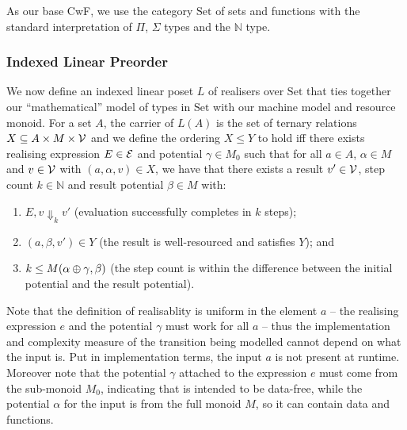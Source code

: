 \documentclass[acmsmall,review]{acmart}
\newcommand{\Set}{\mathrm{Set}}
\begin{document}
As our base CwF, we use the category $\Set$ of sets and functions with
the standard interpretation of $\Pi$, $\Sigma$ types and the
$\mathbb{N}$ type.

\subsubsection{Indexed Linear Preorder}
\label{sec:realisability-indexed-linear-preorder}

We now define an indexed linear poset $L$ of realisers over $\Set$
that ties together our ``mathematical'' model of types in $\Set$ with
our machine model and resource monoid. For a set $A$, the carrier of
$L(A)$ is the set of ternary relations
$X \subseteq A \times M \times \mathcal{V}$ and we define the ordering
$X \leq Y$ to hold iff there exists realising expression
$E \in \mathcal{E}$ and potential $\gamma \in M_0$ such that for all
$a \in A$, $\alpha \in M$ and $v \in \mathcal{V}$ with
$(a,\alpha,v) \in X$, we have that there exists a result
$v' \in \mathcal{V}$, step count $k \in \mathbb{N}$ and result potential
$\beta \in M$ with:
\begin{enumerate}
\item $E, v \Downarrow_k v'$ (evaluation successfully completes in $k$ steps);
\item $(a, \beta, v') \in Y$ (the result is well-resourced and
  satisfies $Y$); and
\item $k \leq M(\alpha \oplus \gamma, \beta)$ (the step count is within the
  difference between the initial potential and the result potential).
\end{enumerate}
Note that the definition of realisablity is uniform in the element $a$
-- the realising expression $e$ and the potential $\gamma$ must work
for all $a$ -- thus the implementation and complexity measure of the
transition being modelled cannot depend on what the input is. Put in
implementation terms, the input $a$ is not present at
runtime. Moreover note that the potential $\gamma$ attached to the
expression $e$ must come from the sub-monoid $M_0$, indicating that is
intended to be data-free, while the potential $\alpha$ for the input
is from the full monoid $M$, so it can contain data and functions.
\end{document}
